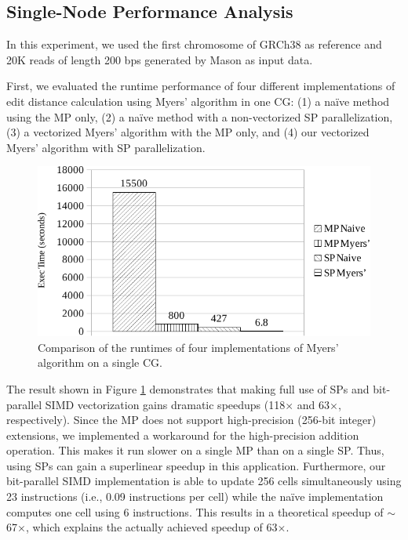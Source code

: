 \documentclass[conference]{IEEEtran}
\begin{document}
\subsection{Single-Node Performance Analysis}

In this experiment, we used the first chromosome of GRCh38 as reference and 20K reads of length 200 bps generated by Mason as input data. 

First, we evaluated the runtime performance of four different implementations of edit distance calculation using Myers' algorithm in one CG: (1) a na\"ive method using the MP only, (2) a na\"ive method with a non-vectorized SP parallelization, (3) a vectorized Myers' algorithm with the MP only, and (4) our vectorized Myers' algorithm with SP parallelization. 

\begin{figure}[!htb]
	\begin{center}
		\includegraphics[width=1\linewidth]{VarVerCha}
		\caption{Comparison of the runtimes of four implementations of Myers' algorithm on a single CG.}
		\label{VarVerCha}
	\end{center}
\end{figure}

The result shown in Figure \ref{VarVerCha} demonstrates that making full use of SPs and bit-parallel SIMD vectorization gains dramatic speedups (118$\times$ and 63$\times$, respectively). Since the MP does not support high-precision (256-bit integer) extensions, we implemented a workaround for the high-precision addition operation. This makes it run slower on a single MP than on a single SP. Thus, using SPs can gain a superlinear speedup in this application. Furthermore, our bit-parallel SIMD implementation is able to update 256 cells simultaneously using 23 instructions (i.e., 0.09 instructions per cell) while the na\"ive implementation computes one cell using 6 instructions. This results in a theoretical speedup of $\sim$67$\times$, which explains the actually achieved speedup of 63$\times$.
\end{document}
